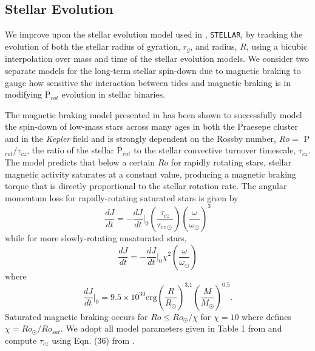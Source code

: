 \documentclass[twocolumn]{aastex61}
\newcommand{\stellar}[0]{\texttt{STELLAR}\xspace}
\newcommand{\kepler}[0]{\textit{Kepler}\xspace}
\begin{document}
\subsection{Stellar Evolution} \label{sec:methods:stellar}

We improve upon the stellar evolution model used in \citet{Fleming2018}, \stellar, by tracking the evolution of both the stellar radius of gyration, $r_g$, and radius, $R$, using a bicubic interpolation over mass and time of the \citet{Baraffe2015} stellar evolution models. We consider two separate models for the long-term stellar spin-down due to magnetic braking to gauge how sensitive the interaction between tides and magnetic braking is in modifying P$_{rot}$ evolution in stellar binaries. 

The magnetic braking model presented in \citet{Matt2015} has been shown to successfully model the spin-down of low-mass stars across many ages in both the Praesepe cluster and in the \kepler field and is strongly dependent on the Rossby number, $Ro = $ P$_{rot}/\tau_{cz}$, the ratio of the stellar P$_{rot}$ to the stellar convective turnover timescale, $\tau_{cz}$. The \citet{Matt2015} model predicts that below a certain $Ro$ for rapidly rotating stars, stellar magnetic activity saturates at a constant value, producing a magnetic braking torque that is directly proportional to the stellar rotation rate.  The angular momentum loss for rapidly-rotating saturated stars is given by
\begin{equation} \label{eqn:mattUnSat}
\frac{dJ}{dt} = -\frac{dJ}{dt}\Bigg|_0 \left( \frac{\tau_{cz}}{\tau_{cz \odot}} \right) \left( \frac{\omega}{\omega_{\odot}} \right)^3 
\end{equation}
while for more slowly-rotating unsaturated stars,
\begin{equation} \label{eqn:mattSat}
\frac{dJ}{dt} = -\frac{dJ}{dt}\Bigg|_0 \chi^2 \left( \frac{\omega}{\omega_{\odot}} \right) 
\end{equation}
where
\begin{equation} \label{eqn:matt0}
\frac{dJ}{dt}\Bigg|_0 = 9.5 \times 10^{30} \mathrm{erg} \left( \frac{R}{R_{\odot}} \right)^{3.1} \left( \frac{M}{M_{\odot}} \right)^{0.5}.
\end{equation}
Saturated magnetic braking occurs for $Ro \leq Ro_{\odot}/\chi$ for $\chi = 10$ where \citet{Matt2015} defines $\chi = Ro_{\odot}/Ro_{sat}$.  We adopt all model parameters given in Table 1 from \citet{Matt2015} and compute $\tau_{cz}$ using Eqn. (36) from \citet{Cranmer2011}.
\end{document}
